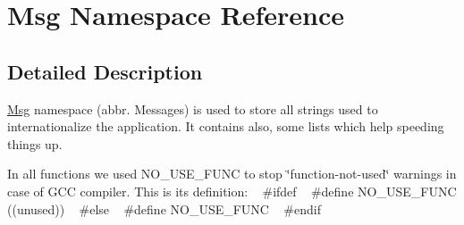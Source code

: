 \hypertarget{namespace_msg}{}\section{Msg Namespace Reference}
\label{namespace_msg}


\subsection{Detailed Description}
\hyperlink{namespace_msg}{Msg} namespace (abbr. Messages) is used to store all strings used to internationalize the application. It contains also, some lists which help speeding things up.

In all functions we used N\+O\+\_\+\+U\+S\+E\+\_\+\+F\+U\+NC to stop \char`\"{}function-\/not-\/used\char`\"{} warnings in case of G\+CC compiler. This is its definition\+: ~\newline
\#ifdef  ~\newline
\#define N\+O\+\_\+\+U\+S\+E\+\_\+\+F\+U\+NC  ((unused)) ~\newline
\#else ~\newline
\#define N\+O\+\_\+\+U\+S\+E\+\_\+\+F\+U\+NC ~\newline
\#endif ~\newline
